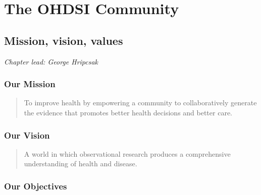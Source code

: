 \documentclass[11pt]{book}
\theoremstyle{definition}
\theoremstyle{definition}
\theoremstyle{definition}
\theoremstyle{remark}
\begin{document}
\mainmatter

\hypertarget{part-the-ohdsi-community}{%
\part{The OHDSI Community}\label{part-the-ohdsi-community}}

\hypertarget{MissionVissionValues}{%
\chapter{Mission, vision, values}\label{MissionVissionValues}}

\emph{Chapter lead: George Hripcsak}

\hypertarget{our-mission}{%
\section{Our Mission}\label{our-mission}}

\begin{quote}
To improve health by empowering a community to collaboratively generate the evidence that promotes better health decisions and better care.
\end{quote}

\hypertarget{our-vision}{%
\section{Our Vision}\label{our-vision}}

\begin{quote}
A world in which observational research produces a comprehensive understanding of health and disease.
\end{quote}

\hypertarget{our-objectives}{%
\section{Our Objectives}\label{our-objectives}}
\end{document}
